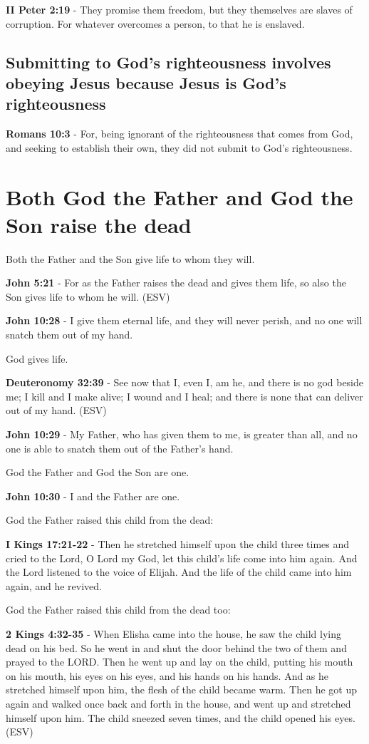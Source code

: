 \documentclass[11pt]{article}
\begin{document}
\textbf{II Peter 2:19} - They promise them freedom, but they themselves are slaves of corruption. For whatever overcomes a person, to that he is enslaved.

\subsection{Submitting to God's righteousness involves obeying Jesus because Jesus is God's righteousness}
\label{sec:orgfac0b67}

\textbf{Romans 10:3} - For, being ignorant of the righteousness that comes from God, and seeking to establish their own, they did not submit to God's righteousness.

\section{Both God the Father and God the Son raise the dead}
\label{sec:org18c70f6}
Both the Father and the Son give life to whom they will.

\textbf{John 5:21} - For as the Father raises the dead and gives them life, so also the Son gives life to whom he will. (ESV)

\textbf{John 10:28} - I give them eternal life, and they will never perish, and no one will snatch them out of my hand.

God gives life.

\textbf{Deuteronomy 32:39} - See now that I, even I, am he, and there is no god beside me; I kill and I make alive; I wound and I heal; and there is none that can deliver out of my hand. (ESV)

\textbf{John 10:29} - My Father, who has given them to me, is greater than all, and no one is able to snatch them out of the Father's hand.

God the Father and God the Son are one.

\textbf{John 10:30} - I and the Father are one.

God the Father raised this child from the dead:

\textbf{I Kings 17:21-22} - Then he stretched himself upon the child three times and cried to the Lord, O Lord my God, let this child's life come into him again. And the Lord listened to the voice of Elijah. And the life of the child came into him again, and he revived.

God the Father raised this child from the dead too:

\textbf{2 Kings 4:32-35} -  When Elisha came into the house, he saw the child lying dead on his bed.  So he went in and shut the door behind the two of them and prayed to the LORD.  Then he went up and lay on the child, putting his mouth on his mouth, his eyes on his eyes, and his hands on his hands.  And as he stretched himself upon him, the flesh of the child became warm.  Then he got up again and walked once back and forth in the house, and went up and stretched himself upon him. The child sneezed seven times, and the child opened his eyes.  (ESV)
\end{document}
